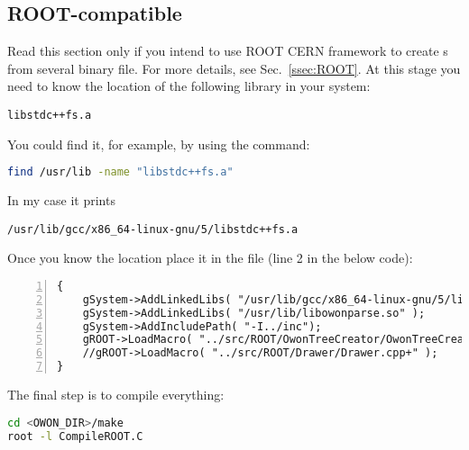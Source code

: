 \subsection{ROOT-compatible}\label{ssec:install:ROOT}
Read this section only if you intend to use ROOT CERN framework to create s
from several binary file. For more details, see Sec.~\ref{ssec:ROOT}.
At this stage you need to know the location of the following library in your system:
\begin{lstlisting}
libstdc++fs.a
\end{lstlisting}
You could find it, for example, by using the  command:
\begin{lstlisting}[language=bash]
find /usr/lib -name "libstdc++fs.a"
\end{lstlisting}
In my case it prints 
\begin{lstlisting}
/usr/lib/gcc/x86_64-linux-gnu/5/libstdc++fs.a
\end{lstlisting}
Once you know the location place it in the  file
(line 2 in the below code):
\begin{lstlisting}[numbers=left]
{
    gSystem->AddLinkedLibs( "/usr/lib/gcc/x86_64-linux-gnu/5/libstdc++fs.a" );//place the correct path to the libstdc++fs.a
    gSystem->AddLinkedLibs( "/usr/lib/libowonparse.so" );
    gSystem->AddIncludePath( "-I../inc");
    gROOT->LoadMacro( "../src/ROOT/OwonTreeCreator/OwonTreeCreator.cpp+" );
    //gROOT->LoadMacro( "../src/ROOT/Drawer/Drawer.cpp+" );
}
\end{lstlisting}

The final step is to compile everything: 
\begin{lstlisting}[language=bash]
cd <OWON_DIR>/make
root -l CompileROOT.C
\end{lstlisting}
